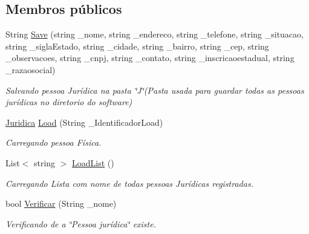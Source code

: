 \subsection*{Membros públicos}
\begin{DoxyCompactItemize}
\item 
String \hyperlink{class_model_1_1_pessoa__e___usuario_1_1_juridica_aa6276e88b7f8ebfdeba461d011d264a7}{Save} (string \+\_\+nome, string \+\_\+endereco, string \+\_\+telefone, string \+\_\+situacao, string \+\_\+sigla\+Estado, string \+\_\+cidade, string \+\_\+bairro, string \+\_\+cep, string \+\_\+observacoes, string \+\_\+cnpj, string \+\_\+contato, string \+\_\+inscricaoestadual, string \+\_\+razaosocial)
\begin{DoxyCompactList}\small\item\em Salvando pessoa Jurídica na pasta \char`\"{}\+J\char`\"{}(Pasta usada para guardar todas as pessoas jurídicas no diretorio do software) \end{DoxyCompactList}\item 
\hyperlink{class_model_1_1_pessoa__e___usuario_1_1_juridica}{Juridica} \hyperlink{class_model_1_1_pessoa__e___usuario_1_1_juridica_a0178595c1d5df0fa74712c465f469345}{Load} (String \+\_\+\+Identificador\+Load)
\begin{DoxyCompactList}\small\item\em Carregando pessoa Física. \end{DoxyCompactList}\item 
List$<$ string $>$ \hyperlink{class_model_1_1_pessoa__e___usuario_1_1_juridica_ac7b5ac912bb65ee21b26ef2c99cc5123}{Load\+List} ()
\begin{DoxyCompactList}\small\item\em Carregando Lista com nome de todas pessoas Jurídicas registradas. \end{DoxyCompactList}\item 
bool \hyperlink{class_model_1_1_pessoa__e___usuario_1_1_juridica_a01755510e8044733c5a795804bd11523}{Verificar} (String \+\_\+nome)
\begin{DoxyCompactList}\small\item\em Verificando de a \char`\"{}\+Pessoa jurídica\char`\"{} existe. \end{DoxyCompactList}\end{DoxyCompactItemize}
